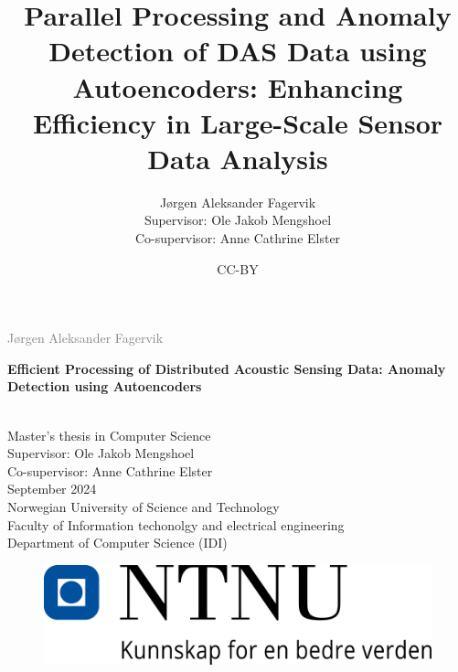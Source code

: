 \documentclass[british]{ntnuthesis}
\title{Parallel Processing and Anomaly Detection of DAS Data using Autoencoders: Enhancing Efficiency in Large-Scale Sensor Data Analysis}
\author{Jørgen Aleksander Fagervik \\
        Supervisor: Ole Jakob Mengshoel \\
        Co-supervisor: Anne Cathrine Elster}
\date{CC-BY \ntnuthesisdate}
\begin{document}
\begin{titlepage}
\vspace*{1.5cm}

\noindent  \textcolor{gray}{\large Jørgen Aleksander Fagervik} \\
\vspace{1cm}

\noindent \textbf{\Large Efficient Processing of Distributed Acoustic Sensing Data: Anomaly Detection using Autoencoders} \\
\vspace{0.5cm}

 \\



\vspace{7cm}
\noindent Master's thesis in Computer Science \\
Supervisor: Ole Jakob Mengshoel \\
Co-supervisor: Anne Cathrine Elster \\
September 2024 \\

\vspace{0.2cm}
\noindent Norwegian University of Science and Technology \\
Faculty of Information techonolgy and electrical engineering \\
Department of Computer Science (IDI) \\

\begin{figure}[h]
\includegraphics[scale=0.5]{figures/ntnu.png}
\end{figure}
\end{titlepage}
\restoregeometry
\myemptypage 





\tableofcontents
\listoffigures
\listoftables
\lstlistoflistings

\printglossary[type=\acronymtype] %
\printglossary                    %










\chapter*{\bibname}
\printbibliography[heading=none]

\appendix
%





\end{document}
